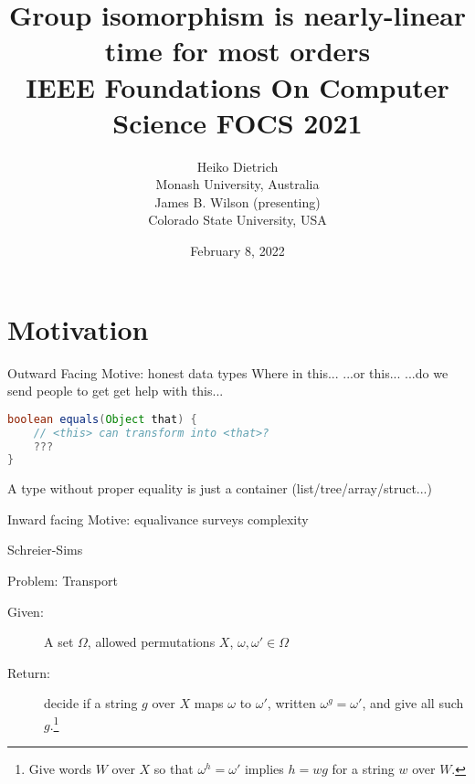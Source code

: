 \documentclass{beamer}
\begin{document}
\title{Group isomorphism is nearly-linear time for most
orders\\ {\small IEEE Foundations On Computer Science FOCS 2021}}
\author{Heiko Dietrich\\ Monash University, Australia\\[10pt] James B. Wilson (presenting)\\ Colorado State University, USA}
\date{February 8, 2022}

\maketitle

\section{Motivation}

\begin{frame}[containsverbatim]{Outward Facing Motive: honest data types}
Where in this... 
...or this...
...do we send people to get get help with this... 

\bigskip
\begin{lstlisting}[mathescape=true,language=Java,basicstyle=\ttfamily,commentstyle=\color{csugreen},keywordstyle=\color{blue}]
boolean equals(Object that) {
    // <this> can transform into <that>?
    ???
}
\end{lstlisting}
    
\vfill
A type without proper equality is just a container (list/tree/array/struct...)
\end{frame}

\begin{frame}[containsverbatim]{Inward facing Motive: equalivance surveys complexity}


\end{frame}

\begin{frame}{Schreier-Sims}

    \begin{block}{Problem: Transport}
    \begin{description}
        \item[Given:] A set $\Omega$, allowed permutations $X$, $\omega,\omega'\in\Omega$
        \item[Return:] decide if a string $g$ over $X$ maps $\omega$ to $\omega'$, 
        written $\omega^{g}=\omega'$, and give all such $g$.\footnote{Give words $W$ over $X$
        so that $\omega^h=\omega'$ implies $h=wg$ for a string $w$ over $W$.}
    \end{description}
    \end{block}
\end{frame}
\end{document}
